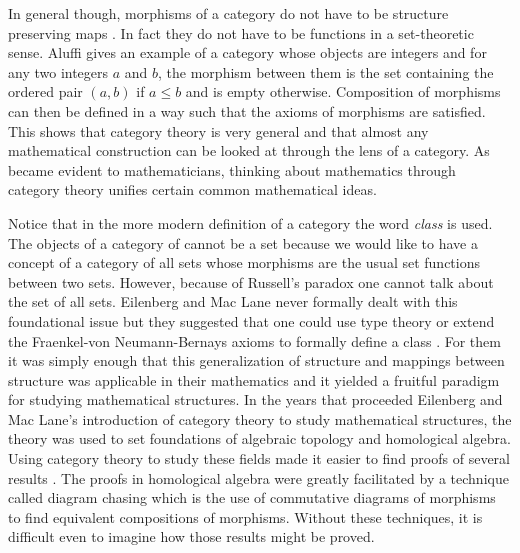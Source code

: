 \documentclass[11pt]{article}
\theoremstyle{definition}
\begin{document}
In general though, morphisms of a category do not have to be structure preserving maps \cite{sep-category-theory}. In fact they do not have to be functions in a set-theoretic sense. 
Aluffi \cite{aluffi2009algebra} gives an example of a category whose objects are integers and for any two integers $a$ and $b$, the morphism between them is the set containing the ordered pair $(a,b)$ if $a \leq b$ and is empty otherwise.
Composition of morphisms can then be defined in a way such that the axioms of morphisms are satisfied.
This shows that category theory is very general and that almost any mathematical construction can be looked at through the lens of a category.
As became evident to mathematicians, thinking about mathematics through category theory unifies certain common mathematical ideas. 




Notice that in the more modern definition of a category the word \textit{class} is used.
The objects of a category of cannot be a set because we would like to have a concept of a category of all sets whose morphisms are the usual set functions between two sets.
However, because of Russell's paradox one cannot talk about the set of all sets. 
Eilenberg and Mac Lane never formally dealt with this foundational issue but they suggested that one could use type theory or extend the Fraenkel-von Neumann-Bernays axioms to formally define a class \cite{MarquisJean-Pierre2009FaGP}. 
For them it was simply enough that this generalization of structure and mappings between structure was applicable in their mathematics and it yielded a fruitful paradigm for studying mathematical structures. 
In the years that proceeded Eilenberg and Mac Lane's introduction of category theory to study mathematical structures, the theory was used to set foundations of algebraic topology and homological algebra. 
Using category theory to study these fields made it easier to find proofs of several results \cite{sep-category-theory}.
The proofs in homological algebra were greatly facilitated by a technique called diagram chasing which is the use of commutative diagrams of morphisms to find equivalent compositions of morphisms.
Without these techniques, it is difficult even to imagine how those results might be proved.
\end{document}
